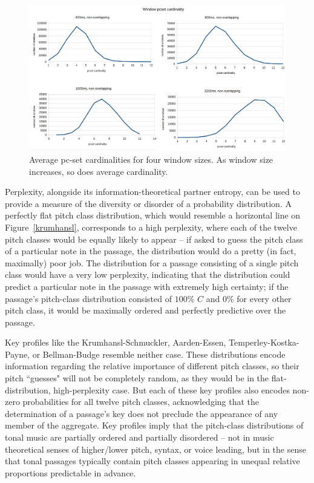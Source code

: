 \begin{landscape}
\begin{figure}
	\centering
	\includegraphics[width=8in]{cardinalities.jpg}
	\caption{Average pc-set cardinalities for four window sizes.  As window size increases, so does average cardinality.}
	\label{cardinalities}
\end{figure}
\end{landscape}

Perplexity, alongside its information-theoretical partner entropy, can be used to provide a measure of the diversity or disorder of a probability distribution.  A perfectly flat pitch class distribution, which would resemble a horizontal line on Figure~\ref{krumhansl}, corresponds to a high perplexity, where each of the twelve pitch classes would be equally likely to appear -- if asked to guess the pitch class of a particular note in the passage, the distribution would do a pretty (in fact, maximally) poor job.  The distribution for a passage consisting of a single pitch class would have a very low perplexity, indicating that the distribution could predict a particular note in the passage with extremely high certainty; if the passage's pitch-class distribution consisted of $100 \%$ $C$ and $0 \%$ for every other pitch class, it would be maximally ordered and perfectly predictive over the passage.

Key profiles like the Krumhansl-Schmuckler, Aarden-Essen, Temperley-Kostka-Payne, or Bellman-Budge resemble neither case.  These distributions encode information regarding the relative importance of different pitch classes, so their pitch ``guesses" will not be completely random, as they would be in the flat-distribution, high-perplexity case.  But each of these key profiles also encodes non-zero probabilities for all twelve pitch classes, acknowledging that the determination of a passage's key does not preclude the appearance of any member of the aggregate.  Key profiles imply that the pitch-class distributions of tonal music are partially ordered and partially disordered -- not in music theoretical senses of higher/lower pitch, syntax, or voice leading, but in the sense that tonal passages typically contain pitch classes appearing in unequal relative proportions predictable in advance.

